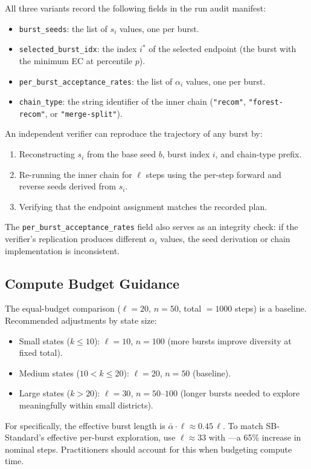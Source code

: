 All three variants record the following fields in the run audit manifest:
\begin{itemize}
  \item \texttt{burst\_seeds}: the list of $s_i$ values, one per burst.
  \item \texttt{selected\_burst\_idx}: the index $i^*$ of the selected
        endpoint (the burst with the minimum EC at percentile $p$).
  \item \texttt{per\_burst\_acceptance\_rates}: the list of $\alpha_i$
        values, one per burst.
  \item \texttt{chain\_type}: the string identifier of the inner chain
        (\texttt{"recom"}, \texttt{"forest-recom"}, or
        \texttt{"merge-split"}).
\end{itemize}

An independent verifier can reproduce the trajectory of any burst by:
\begin{enumerate}
  \item Reconstructing $s_i$ from the base seed $b$, burst index $i$,
        and chain-type prefix.
  \item Re-running the inner chain for $\ell$ steps using the per-step
        forward and reverse seeds derived from $s_i$.
  \item Verifying that the endpoint assignment matches the recorded plan.
\end{enumerate}

The \texttt{per\_burst\_acceptance\_rates} field also serves as an
integrity check: if the verifier's replication produces different
$\alpha_i$ values, the seed derivation or chain implementation is
inconsistent.

\subsection{Compute Budget Guidance}

The equal-budget comparison ($\ell = 20$, $n = 50$, total $= 1000$ steps)
is a baseline.
Recommended adjustments by state size:
\begin{itemize}
  \item Small states ($k \leq 10$): $\ell = 10$, $n = 100$ (more bursts
        improve diversity at fixed total).
  \item Medium states ($10 < k \leq 20$): $\ell = 20$, $n = 50$ (baseline).
  \item Large states ($k > 20$): $\ell = 30$, $n = 50$--$100$ (longer
        bursts needed to explore meaningfully within small districts).
\end{itemize}

For \sbf{} specifically, the effective burst length is
$\bar\alpha \cdot \ell \approx 0.45\,\ell$.
To match SB-Standard's effective per-burst exploration, use
$\ell \approx 33$ with \sbf{}---a 65\% increase in nominal steps.
Practitioners should account for this when budgeting compute time.
